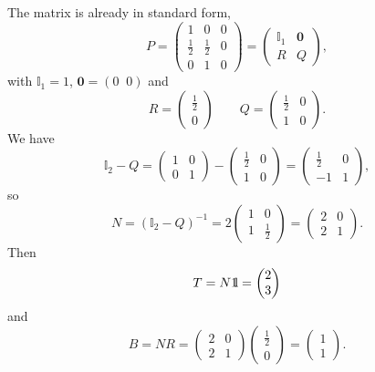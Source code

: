 The matrix is already in standard form,
\[
P=\left (
\begin{array}{ccc}
1 & 0 & 0 \\
\frac 12 & \frac 12 & 0 \\
0 & 1 & 0
\end{array}\right)
=\begin{pmatrix}
\mathbb{I}_1 & \mathbf{0} \\
R & Q
\end{pmatrix},
\]
with $\mathbb{I}_1=1$, $\mathbf{0}=(0\;\; 0)$ and
\[
R=\begin{pmatrix}
\frac 12\\ 0
\end{pmatrix}
\qquad
Q=\begin{pmatrix}
\frac 12 & 0\\
1 & 0
\end{pmatrix}.
\]
We have
\[
\mathbb{I}_2-Q=\begin{pmatrix}
1 & 0 \\
0 & 1
\end{pmatrix}
-\begin{pmatrix}
\frac 12 & 0\\
1 & 0
\end{pmatrix}
=\begin{pmatrix}
\frac 12 & 0\\
-1 & 1
\end{pmatrix},
\]
so
\[
N=(\mathbb{I}_2-Q)^{-1}=
2\begin{pmatrix}
1 & 0 \\
1 & \frac 12
\end{pmatrix}=
\begin{pmatrix}
2 & 0 \\
2 & 1
\end{pmatrix}.
\]
Then
\[
T=N\nbOne=\begin{pmatrix}
2\\
3
\end{pmatrix}
\]
and
\[
B=NR=
\begin{pmatrix}
2 & 0 \\
2 & 1
\end{pmatrix}
\begin{pmatrix}
\frac 12\\ 0
\end{pmatrix}
=
\begin{pmatrix}
1\\ 1
\end{pmatrix}.
\]